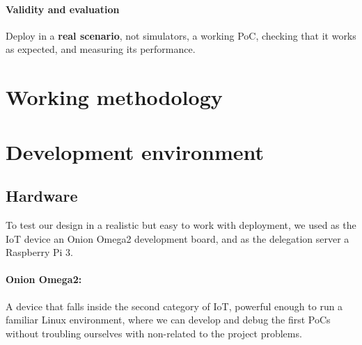 \paragraph{Validity and evaluation} Deploy in a \textbf{real scenario}, not simulators, a working \ac{PoC}, checking that it works as expected, and measuring its performance.



\section{Working methodology}






\section{Development environment}


\subsection{Hardware}

To test our design in a realistic but easy  to work with deployment, we used as the \ac{IoT} device an Onion Omega2 development board, and as the delegation server a Raspberry Pi 3.


\paragraph{Onion Omega2:} A device that falls inside the second category of IoT, powerful enough to run a familiar Linux environment, where we can develop and debug the first \acp{PoC} without troubling ourselves with non-related to the project problems.


